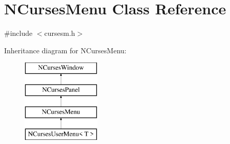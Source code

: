 \hypertarget{class_n_curses_menu}{\section{N\-Curses\-Menu Class Reference}
\label{class_n_curses_menu}
}


{\ttfamily \#include $<$cursesm.\-h$>$}

Inheritance diagram for N\-Curses\-Menu\-:\begin{figure}[H]
\begin{center}
\leavevmode
\includegraphics[height=4.000000cm]{class_n_curses_menu}
\end{center}
\end{figure}
